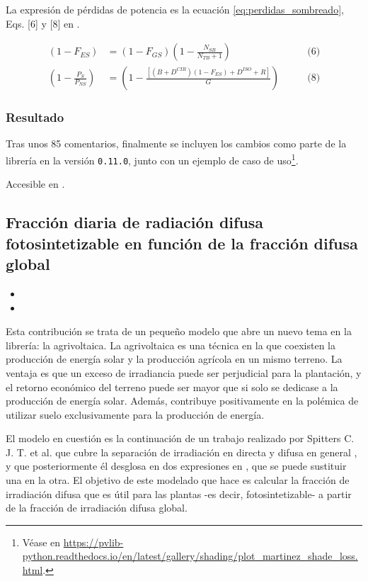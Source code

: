 La expresión de pérdidas de potencia es la ecuación \ref{eq:perdidas_sombreado}, Eqs. [6] y [8] en \cite{Martínez-Moreno_Muñoz_Lorenzo_2010}.

\begin{equation} \label{eq:perdidas_sombreado}
    \begin{alignedat}{3}
        (1 - F_{ES}) &= (1 - F_{GS}) \left(1 - \frac{N_{SB}}{N_{TB} + 1}\right) \qquad &\text{(6)}\\
        \left(1 - \frac{P_{S}}{P_{NS}}\right) &= \left(1 - \frac{\left[(B + D^{CIR})(1 - F_{ES}) + D^{ISO} + R\right]}{G}\right) \qquad &\text{(8)}
    \end{alignedat}
\end{equation}

\subsubsection{Resultado}

Tras unos 85 comentarios, finalmente se incluyen los cambios como parte de la librería en la versión \texttt{0.11.0}, junto con un ejemplo de caso de uso\footnote{Véase en \url{https://pvlib-python.readthedocs.io/en/latest/gallery/shading/plot_martinez_shade_loss.html}.}.

Accesible en .

\subsection{Fracción diaria de radiación difusa fotosintetizable en función de la fracción difusa global}

\begin{itemize}
    \item {}
    \item {}
\end{itemize}

Esta contribución se trata de un pequeño modelo que abre un nuevo tema en la librería: la agrivoltaica. La agrivoltaica es una técnica en la que coexisten la producción de energía solar y la producción agrícola en un mismo terreno. La ventaja es que un exceso de irradiancia puede ser perjudicial para la plantación, y el retorno económico del terreno puede ser mayor que si solo se dedicase a la producción de energía solar. Además, contribuye positivamente en la polémica de utilizar suelo exclusivamente para la producción de energía.

El modelo en cuestión es la continuación de un trabajo realizado por Spitters C. J. T. et al. que cubre la separación de irradiación en directa y difusa en general \cite{Spitters_Toussaint_Goudriaan_1986}, y que posteriormente él desglosa en dos expresiones en \cite{Spitters_1986}, que se puede sustituir una en la otra. El objetivo de este modelado que hace es calcular la fracción de irradiación difusa que es útil para las plantas -es decir, fotosintetizable- a partir de la fracción de irradiación difusa global.

